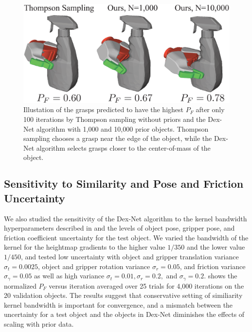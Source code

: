 \begin{figure}[t!]
\centering
\includegraphics[scale=0.28]{figures/illustrations/spray_grasps.eps}
\caption{Illustation of the grasps predicted to have the highest $P_F$ after only 100 iterations by Thompson sampling without priors and the Dex-Net algorithm with 1,000 and 10,000 prior objects. Thompson sampling chooses a grasp near the edge of the object, while the Dex-Net algorithm selects grasps closer to the center-of-mass of the object.}
\vspace*{-5pt}
\end{figure}

\subsection{Sensitivity to Similarity and Pose and Friction Uncertainty}
We also studied the sensitivity of the Dex-Net algorithm to the kernel bandwidth hyperparameters described in  and the levels of object pose, gripper pose, and friction coefficient uncertainty for the test object.
We varied the bandwidth of the kernel for the heightmap gradients to the higher value $1 / 350$ and the lower value $1 / 450$, and tested low uncertainty with object and gripper translation variance $\sigma_{t} = 0.0025$, object and gripper rotation variance $\sigma_{r} = 0.05$, and friction variance $\sigma_{\gamma} = 0.05$ as well as high variance $\sigma_{t} = 0.01, \sigma_{r} = 0.2,$ and $\sigma_{\gamma} = 0.2$.
 shows the normalized $P_F$ versus iteration averaged over 25 trials for 4,000 iterations on the 20 validation objects.
The results suggest that conservative setting of similiarity kernel bandwidth is important for convergence, and a mismatch between the uncertainty for a test object and the objects in Dex-Net diminishes the effects of scaling with prior data. 

